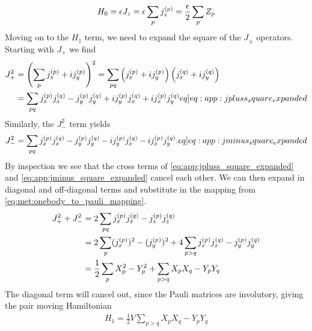 \begin{align*}
    H_0 = \epsilon J_z = \epsilon \sum_{p} j_{z}^{(p)} = \frac{\epsilon}{2} \sum_p Z_p
\end{align*}
Moving on to the $H_1$ term, we need to expand the square of the $J_\pm$ operators. Starting with $J_+$ we find
\begin{align}
    J_+^2 &= \pclosed{\sum_p \spinsmall{x}{p} + i\spinsmall{y}{p}}^2 = \sum_{pq}\pclosed{\spinsmall{x}{p} + i\spinsmall{y}{p}}\pclosed{\spinsmall{x}{q} + i\spinsmall{y}{q}} \nonumber\\
    &= \sum_{pq} \spinsmall{x}{p}\spinsmall{x}{q} - \spinsmall{y}{p}\spinsmall{y}{q} + i\spinsmall{y}{p}\spinsmall{x}{q} + i\spinsmall{x}{p}\spinsmall{y}{q} \label[eq]{eq:app:jpluss_square_expanded}
\end{align}
Similarly, the $J_-^2$ term yields
\begin{align}
    J_-^2 = \sum_{pq} \spinsmall{x}{p}\spinsmall{x}{q} - \spinsmall{y}{p}\spinsmall{y}{q} - i\spinsmall{y}{p}\spinsmall{x}{q} - i\spinsmall{x}{p}\spinsmall{y}{q}. \label[eq]{eq:app:jminus_square_expanded}
\end{align}
By inspection we see that the cross terms of \cref{eq:app:jpluss_square_expanded} and \cref{eq:app:jminus_square_expanded} cancel each other. We can then expand in diagonal and off-diagonal terms and substitute in the mapping from \cref{eq:met:onebody_to_pauli_mapping}.
\begin{align*}
    J_+^2 + J_-^2 &= 2\sum_{pq} j_{x}^{(p)}j_{x}^{(q)} - j_{z}^{(p)}j_{z}^{(q)} \\
    &= 2 \sum_p (j_{x}^{(p)})^2 - (j_{y}^{(p)})^2 + 4\sum_{p > q} j_{x}^{(p)}j_{x}^{(q)} - j_{y}^{(p)}j_{y}^{(q)} \\
    &= \frac{1}{2} \sum_p X_p^2 - Y_p^2 + \sum_{p > q} X_p X_q - Y_p Y_q
\end{align*}
The diagonal term will cancel out, since the Pauli matrices are involutory, giving the pair moving Hamiltonian
\begin{align*}
    H_1 = \frac{1}{2}V \sum_{p > q} X_p X_q - Y_p Y_q 
\end{align*}
